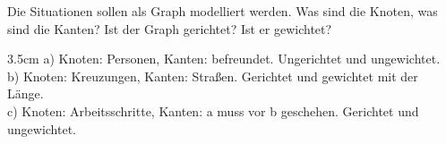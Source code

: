 \question[3]
Die Situationen sollen als Graph modelliert werden. Was sind die Knoten, was sind die Kanten? Ist der Graph gerichtet? Ist er gewichtet?
\begin{solutionbox}{3.5cm}
a) Knoten: Personen, Kanten: befreundet. Ungerichtet und ungewichtet. \\
b) Knoten: Kreuzungen, Kanten: Straßen. Gerichtet und gewichtet mit der Länge. \\
c) Knoten: Arbeitsschritte, Kanten: a muss vor b geschehen. Gerichtet und ungewichtet.
\end{solutionbox}

